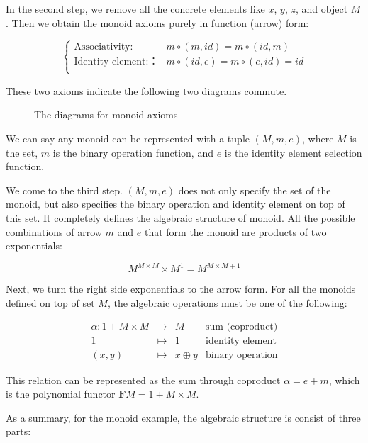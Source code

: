 \documentclass{article}
\begin{document}
\begin{example}
In the second step, we remove all the concrete elements like $x$, $y$, $z$, and object $M$. Then we obtain the monoid axioms purely in function (arrow) form:

\[
\begin{cases}
\text{Associativity:} & m \circ (m, id) = m \circ (id, m) \\
\text{Identity element:：} & m \circ (id, e) = m \circ (e, id) = id \\
\end{cases}
\]

These two axioms indicate the following two diagrams commute.

\begin{figure}[htbp]
\centering
{}
\quad
{}
\caption{The diagrams for monoid axioms}
\end{figure}

We can say any monoid can be represented with a tuple $(M, m , e)$, where $M$ is the set, $m$ is the binary operation function, and $e$ is the identity element selection function.

We come to the third step. $(M, m, e)$ does not only specify the set of the monoid, but also specifies the binary operation and identity element on top of this set. It completely defines the algebraic structure of monoid. All the possible combinations of arrow $m$ and $e$ that form the monoid are products of two exponentials:

\[
M^{M \times M} \times M^1 = M^{M \times M + 1}
\]

Next, we turn the right side exponentials to the arrow form. For all the monoids defined on top of set $M$, the algebraic operations must be one of the following:

\[
\begin{array}{rcll}
\alpha : 1 + M \times M & \longrightarrow & M & \text{sum (coproduct)}\\
1 & \longmapsto & 1 & \text{identity element}  \\
(x, y) & \longmapsto & x \oplus y & \text{binary operation}
\end{array}
\]

This relation can be represented as the sum through coproduct $\alpha = e + m$, which is the polynomial functor $\mathbf{F} M = 1 + M \times M$.

As a summary, for the monoid example, the algebraic structure is consist of three parts:


\end{example}
\end{document}
